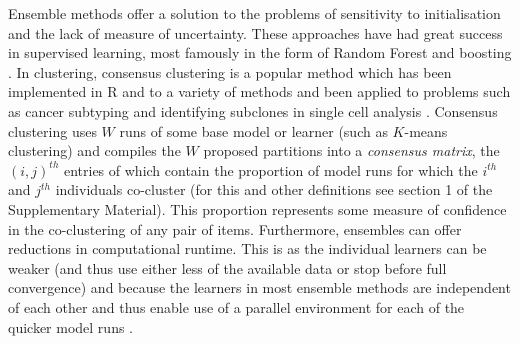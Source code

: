 \documentclass{article}
\begin{document}
Ensemble methods offer a solution to the problems of sensitivity to initialisation and the lack of measure of uncertainty. These approaches have had great success in supervised learning, most famously in the form of Random Forest \citep{breiman2001random} and boosting \citep{friedman2002stochastic}. In clustering, consensus clustering \citep{monti2003consensus} is a popular method which has been implemented in R \citep{wilkerson2010consensusclusterplus} and to a variety of methods \citep{john2020m3c, gu2020cola} and been applied to problems such as cancer subtyping \citep{lehmann2011identification, verhaak2010integrated} and identifying subclones in single cell analysis \citep{kiselev2017sc3}. Consensus clustering uses $W$ runs of some base model or learner (such as $K$-means clustering) and compiles the $W$ proposed partitions into a \emph{consensus matrix}, the $(i, j)^{th}$ entries of which contain the proportion of model runs for which the $i^{th}$ and $j^{th}$ individuals co-cluster (for this and other definitions see section 1 of the Supplementary Material). This proportion represents some measure of confidence in the co-clustering of any pair of items. Furthermore, ensembles can offer reductions in computational runtime. This is as the individual learners can be weaker (and thus use either less of the available data or stop before full convergence) and because the learners in most ensemble methods are independent of each other and thus enable use of a parallel environment for each of the quicker model runs \citep{ghaemi2009survey}. 

\end{document}
